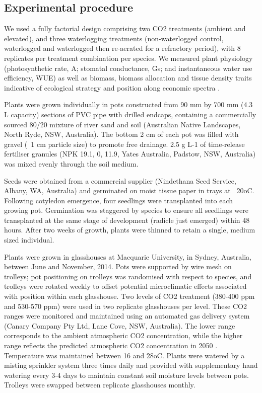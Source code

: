 \documentclass[12pt,a4paper]{memoir}
\begin{document}
\subsection*{Experimental procedure}
We used a fully factorial design comprising two CO2 treatments (ambient and elevated), and three waterlogging treatments (non-waterlogged control, waterlogged and waterlogged then re-aerated for a refractory period), with 8 replicates per treatment combination per species. We measured plant physiology (photosynthetic rate, A; stomatal conductance, Gs; and instantaneous water use efficiency, WUE) as well as biomass, biomass allocation and tissue density traits indicative of ecological strategy and position along economic spectra \cite{Reich2014}.

Plants were grown individually in pots constructed from 90 mm by 700 mm (4.3 L capacity) sections of PVC pipe with drilled endcaps, containing a commercially sourced 80/20 mixture of river sand and soil (Australian Native Landscapes, North Ryde, NSW, Australia). The bottom 2 cm of each pot was filled with gravel (~1 cm particle size) to promote free drainage. 2.5 g L-1 of time-release fertiliser granules (NPK 19.1, 0, 11.9, Yates Australia, Padstow, NSW, Australia) was mixed evenly through the soil medium.

Seeds were obtained from a commercial supplier (Nindethana Seed Service, Albany, WA, Australia) and germinated on moist tissue paper in trays at ~20oC. Following cotyledon emergence, four seedlings were transplanted into each growing pot. Germination was staggered by species to ensure all seedlings were transplanted at the same stage of development (radicle just emerged) within 48 hours. After two weeks of growth, plants were thinned to retain a single, medium sized individual.

Plants were grown in glasshouses at Macquarie University, in Sydney, Australia, between June and November, 2014. Pots were supported by wire mesh on trolleys; pot positioning on trolleys was randomised with respect to species, and trolleys were rotated weekly to offset potential microclimatic effects associated with position within each glasshouse. Two levels of CO2 treatment (380-400 ppm and 530-570 ppm) were used in two replicate glasshouses per level. These CO2 ranges were monitored and maintained using an automated gas delivery system (Canary Company Pty Ltd, Lane Cove, NSW, Australia). The lower range corresponds to the ambient atmospheric CO2 concentration, while the higher range reflects the predicted atmospheric CO2 concentration in 2050 \cite{IPCC2014}. Temperature was maintained between 16 and 28oC. Plants were watered by a misting sprinkler system three times daily and provided with supplementary hand watering every 3-4 days to maintain constant soil moisture levels between pots. Trolleys were swapped between replicate glasshouses monthly.
\end{document}
